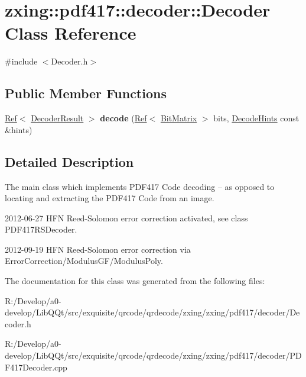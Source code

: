 \hypertarget{classzxing_1_1pdf417_1_1decoder_1_1_decoder}{}\section{zxing\+:\+:pdf417\+:\+:decoder\+:\+:Decoder Class Reference}
\label{classzxing_1_1pdf417_1_1decoder_1_1_decoder}


{\ttfamily \#include $<$Decoder.\+h$>$}

\subsection*{Public Member Functions}
\begin{DoxyCompactItemize}
\item 
\mbox{\label{classzxing_1_1pdf417_1_1decoder_1_1_decoder_a70f4fdb487aa074838ffc097897c6a2f}} 
\mbox{\hyperlink{classzxing_1_1_ref}{Ref}}$<$ \mbox{\hyperlink{classzxing_1_1_decoder_result}{Decoder\+Result}} $>$ {\bfseries decode} (\mbox{\hyperlink{classzxing_1_1_ref}{Ref}}$<$ \mbox{\hyperlink{classzxing_1_1_bit_matrix}{Bit\+Matrix}} $>$ bits, \mbox{\hyperlink{classzxing_1_1_decode_hints}{Decode\+Hints}} const \&hints)
\end{DoxyCompactItemize}


\subsection{Detailed Description}
The main class which implements P\+D\+F417 Code decoding -- as opposed to locating and extracting the P\+D\+F417 Code from an image.

2012-\/06-\/27 H\+FN Reed-\/\+Solomon error correction activated, see class P\+D\+F417\+R\+S\+Decoder. 

2012-\/09-\/19 H\+FN Reed-\/\+Solomon error correction via Error\+Correction/\+Modulus\+G\+F/\+Modulus\+Poly. 

The documentation for this class was generated from the following files\+:\begin{DoxyCompactItemize}
\item 
R\+:/\+Develop/a0-\/develop/\+Lib\+Q\+Qt/src/exquisite/qrcode/qrdecode/zxing/zxing/pdf417/decoder/Decoder.\+h\item 
R\+:/\+Develop/a0-\/develop/\+Lib\+Q\+Qt/src/exquisite/qrcode/qrdecode/zxing/zxing/pdf417/decoder/P\+D\+F417\+Decoder.\+cpp\end{DoxyCompactItemize}
